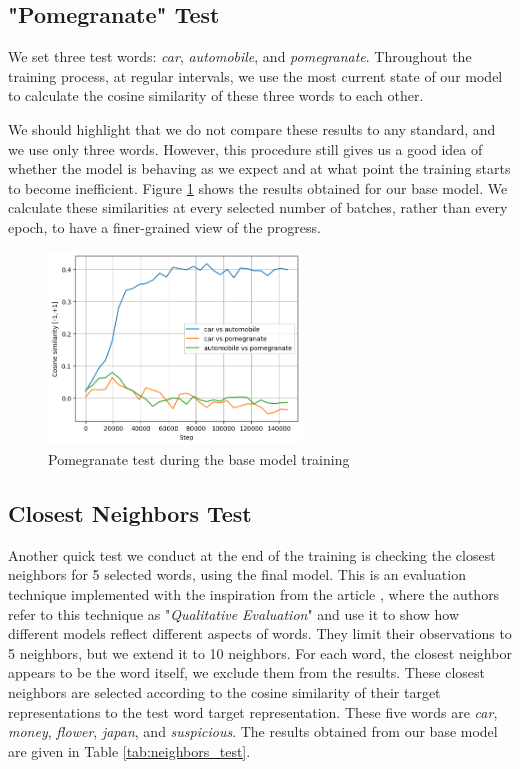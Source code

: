 \subsection{"Pomegranate" Test}
We set three test words: \textit{car}, \textit{automobile}, and \textit{pomegranate}. Throughout the training process, at regular intervals, we use the most current state of our model to calculate the cosine similarity of these three words to each other. 

We should highlight that we do not compare these results to any standard, and we use only three words. However, this procedure still gives us a good idea of whether the model is behaving as we expect and at what point the training starts to become inefficient. Figure \ref{fig:pomegranate-test} shows the results obtained for our base model. We calculate these similarities at every selected number of batches, rather than every epoch, to have a finer-grained view of the progress.

\begin{figure}[ht]
    \centering
    \includegraphics[width=0.6\textwidth]{img/pomegranate-test.png}
    \caption{Pomegranate test during the base model training}
    \label{fig:pomegranate-test}
\end{figure}


\subsection{Closest Neighbors Test}
Another quick test we conduct at the end of the training is checking the closest neighbors for 5 selected words, using the final model. This is an evaluation technique implemented with the inspiration from the article \cite{levy-dependency}, where the authors refer to this technique as "\textit{Qualitative Evaluation}" and use it to show how different models reflect different aspects of words. They limit their observations to 5 neighbors, but we extend it to 10 neighbors. For each word, the closest neighbor appears to be the word itself, we exclude them from the results. These closest neighbors are selected according to the cosine similarity of their target representations to the test word target representation. These five words are \textit{car}, \textit{money}, \textit{flower}, \textit{japan}, and \textit{suspicious}. The results obtained from our base model are given in Table \ref{tab:neighbors_test}.


